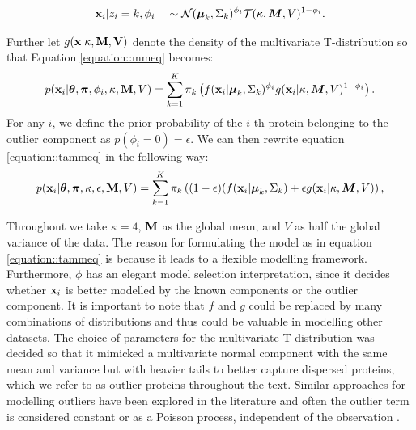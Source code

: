 \documentclass[12pt,english]{article}\usepackage[]{graphicx}\usepackage[]{color}
\begin{document}
\begin{align}
{\bf x}_i | z_i = k, \phi_i \quad \sim \mathcal{N}(\boldsymbol{\mu}_k, \Sigma_k)^{\phi_i}\mathcal{T}(\kappa, \boldsymbol{M}, V)^{1 - \phi_i }.
\end{align}

Further let $g({\bf x | \kappa, \bf{M}, V} )$ denote the density of the multivariate T-distribution so that Equation \eqref{equation::mmeq} becomes:
\begin{equation} \label{equation::tammeq}
  \begin{split}
    p({\bf x}_i| \boldsymbol{\theta}, \boldsymbol{\pi} ,\phi_i, \kappa, {\bf M}, V) &=  \sum_{k=1}^{K}\pi_k\left(f({\bf x}_i|\boldsymbol{\mu}_k, \Sigma_k)^{\phi_i}g({\bf x}_i|\kappa, \boldsymbol{M}, V)^{1 - \phi_i }\right).\\
  \end{split}
\end{equation}
For any $i$, we define the prior probability of the $i$-th protein belonging to the outlier component as $p(\phi_i = 0) = \epsilon$.
We can then rewrite equation \eqref{equation::tammeq} in the following way:
\begin{equation}\label{equation::tammepseq}
  \begin{split}
    p({\bf x}_i| \boldsymbol{\theta}, \boldsymbol{\pi} , \kappa, \epsilon, {\bf M}, V) &=  \sum_{k=1}^{K}\pi_k\left((1-\epsilon)(f({\bf x}_i |\boldsymbol{\mu}_k, \Sigma_k) + \epsilon g({\bf x}_i|\kappa, \boldsymbol{M}, V)\right),\\
  \end{split}
\end{equation}

Throughout we take $\kappa = 4$, ${\bf M}$ as the global mean, and $V$ as half the global variance of the
data. The reason for formulating the model as in equation \eqref{equation::tammeq} is because it leads to a flexible
modelling framework. Furthermore, $\phi$ has an elegant model selection interpretation, since it decides whether
${\bf x}_i$ is better modelled by the known components or the outlier component.
It is important to note that $f$ and $g$ could be replaced by many combinations
of distributions and thus could be valuable in modelling other datasets. The choice of parameters for the
multivariate T-distribution was decided so that it mimicked a multivariate normal component with the
same mean and variance but with heavier tails to better capture dispersed proteins, which we refer
to as outlier proteins throughout the text.
Similar approaches for modelling outliers have
been explored in the literature and often the outlier term is
considered constant or as a Poisson process, independent of
the observation \citep{Banfield::1993, Cooke::2011,
  Coretto::2016, Hennig::2004}.
\end{document}
